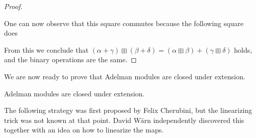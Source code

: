 \begin{proof}
  \begin{center}
  \end{center}
  One can now observe that this square commutes because the following square does
  \begin{center}
  \end{center}
  From this we conclude that $(\alpha + \gamma) \boxplus (\beta + \delta) = (\alpha \boxplus \beta) + (\gamma \boxplus \delta)$ holds, and the binary operations are the same.
\end{proof}

We are now ready to prove that Adelman modules are closed under extension.

\begin{theorem}
  Adelman modules are closed under extension.
\end{theorem}

The following strategy was first proposed by Felix Cherubini, but the linearizing trick was not known at that point. David Wärn independently discovered this together with an idea on how to linearize the maps.

